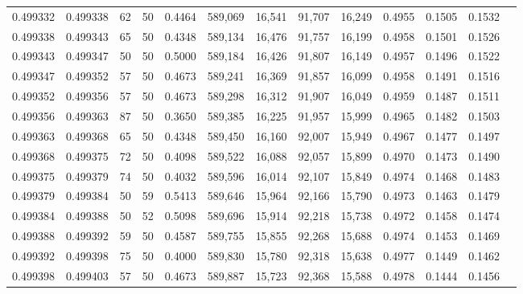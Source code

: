 \begin{tabular}{rrrrrrrrrrrrr}
0.499332 & 0.499338 &    62 &  50 &                                     0.4464 & 589,069 &  16,541 &  91,707 &  16,249 & 0.4955 & 0.1505 & 0.1532 \\
0.499338 & 0.499343 &    65 &  50 &                                     0.4348 & 589,134 &  16,476 &  91,757 &  16,199 & 0.4958 & 0.1501 & 0.1526 \\
0.499343 & 0.499347 &    50 &  50 &                                     0.5000 & 589,184 &  16,426 &  91,807 &  16,149 & 0.4957 & 0.1496 & 0.1522 \\
0.499347 & 0.499352 &    57 &  50 &                                     0.4673 & 589,241 &  16,369 &  91,857 &  16,099 & 0.4958 & 0.1491 & 0.1516 \\
0.499352 & 0.499356 &    57 &  50 &                                     0.4673 & 589,298 &  16,312 &  91,907 &  16,049 & 0.4959 & 0.1487 & 0.1511 \\
0.499356 & 0.499363 &    87 &  50 &                                     0.3650 & 589,385 &  16,225 &  91,957 &  15,999 & 0.4965 & 0.1482 & 0.1503 \\
0.499363 & 0.499368 &    65 &  50 &                                     0.4348 & 589,450 &  16,160 &  92,007 &  15,949 & 0.4967 & 0.1477 & 0.1497 \\
0.499368 & 0.499375 &    72 &  50 &                                     0.4098 & 589,522 &  16,088 &  92,057 &  15,899 & 0.4970 & 0.1473 & 0.1490 \\
0.499375 & 0.499379 &    74 &  50 &                                     0.4032 & 589,596 &  16,014 &  92,107 &  15,849 & 0.4974 & 0.1468 & 0.1483 \\
0.499379 & 0.499384 &    50 &  59 &                                     0.5413 & 589,646 &  15,964 &  92,166 &  15,790 & 0.4973 & 0.1463 & 0.1479 \\
0.499384 & 0.499388 &    50 &  52 &                                     0.5098 & 589,696 &  15,914 &  92,218 &  15,738 & 0.4972 & 0.1458 & 0.1474 \\
0.499388 & 0.499392 &    59 &  50 &                                     0.4587 & 589,755 &  15,855 &  92,268 &  15,688 & 0.4974 & 0.1453 & 0.1469 \\
0.499392 & 0.499398 &    75 &  50 &                                     0.4000 & 589,830 &  15,780 &  92,318 &  15,638 & 0.4977 & 0.1449 & 0.1462 \\
0.499398 & 0.499403 &    57 &  50 &                                     0.4673 & 589,887 &  15,723 &  92,368 &  15,588 & 0.4978 & 0.1444 & 0.1456 \\

\end{tabular}
